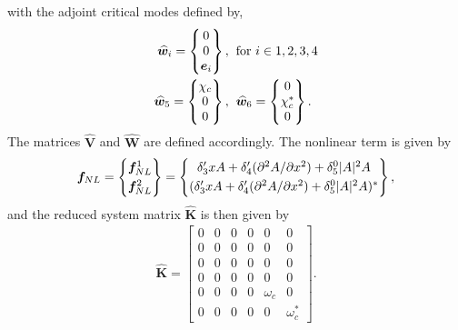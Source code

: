 with the adjoint critical modes defined by,
 \begin{align}
	\widehat{\boldsymbol{w}}_{i} = \begin{Bmatrix}
		0 \\
		0 \\
		\boldsymbol{e}_{i}
	\end{Bmatrix}, & \hspace{2mm} \text{for } i \in 1,2,3,4 \nonumber \\
	\widehat{\boldsymbol{w}}_{5} = \begin{Bmatrix}
		\chi_{c} \\
		0 \\
		0
	\end{Bmatrix}, & \hspace{2mm}
	\widehat{\boldsymbol{w}}_{6} = \begin{Bmatrix}
		0 \\
		\chi^{*}_{c} \\
		0
	\end{Bmatrix}. \nonumber
\end{align}
The matrices $\mathbf{\widehat{V}}$ and $\mathbf{\widehat{W}}$ are defined accordingly.
The nonlinear term is given by
\begin{align}
	\vecf_{NL} = \begin{Bmatrix}
		\vecf^{1}_{NL} \vspace{1mm}\\
		\vecf^{2}_{NL}
	\end{Bmatrix} = 	
	\begin{Bmatrix}
		\delta'_{3}xA + \delta'_{4}(\partial^{2}A/\partial x^{2}) + \delta^{0}_{5}|A|^{2}A	\vspace{1mm} \\
		(\delta'_{3}xA + \delta'_{4}(\partial^{2}A/\partial x^{2}) + \delta^{0}_{5}|A|^{2}A)^{*}
	\end{Bmatrix}, \nonumber
\end{align}
and the reduced system matrix $\mathbf{\widehat{K}}$ is then given by
\begin{align}
	\mathbf{\widehat{K}} = \begin{bmatrix}
		0 & 0 & 0 & 0 & 0& 0 \\ 
		0 & 0 & 0 & 0 & 0& 0 \\ 
		0 & 0 & 0 & 0 & 0& 0 \\ 
		0 & 0 & 0 & 0 & 0& 0 \\ 
		0 & 0 & 0 & 0 & \omega_{c} & 0 \\ 
		0 & 0 & 0 & 0 & 0 & \omega^{*}_{c}
	\end{bmatrix}. \nonumber
\end{align}
